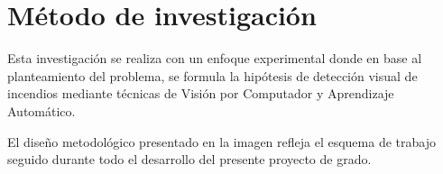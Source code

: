\section{Método de investigación}

\noindent Esta investigación se realiza con un enfoque experimental donde en base al planteamiento del problema, se formula la hipótesis de detección visual de incendios mediante técnicas de Visión por Computador y Aprendizaje Automático.

\noindent El diseño metodológico presentado en la imagen refleja el esquema de trabajo seguido durante todo el desarrollo del presente proyecto de grado.

